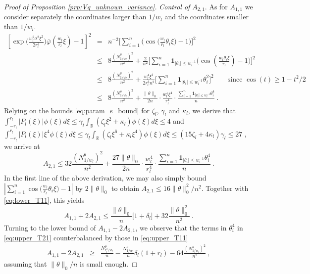 \documentclass[twoside,11pt]{article}
\def\beq{\begin{equation}}
\def\eeq{\end{equation}}
\def\beqn{\begin{eqnarray*}}
\def\eeqn{\end{eqnarray*}}
\def\bbR{\mathbb{R}}
\newcommand{\<}{\langle}
\renewcommand{\>}{\rangle}
\begin{document}
\begin{proof}[Proof of Proposition \ref{prp:Vq_unknown_variance}]
\noindent 
{\it Control of $A_{2,1}$}. As for $A_{1,1}$ we consider separately the coordinates larger than $1/w_l$ and the coordinates smaller than $1/w_l$.
\beqn 
\left[\exp\big(\frac{w_l^2\sigma^2\xi^2}{2r_l^2}\big)\overline{\varphi}(\frac{w_l}{r_l}\xi)- 1\right]^2&=& n^{-2}\big[\sum_{i=1}^n \big(\cos\big(\frac{w_l}{r_l}\theta_i\xi\big) -1\big) \big]^2\\ &\leq& 8 \frac{(N_{1/w_l}^{\theta})^2}{n^2}+\frac{2}{n^2}\big[\sum_{i=1}^n \mathbf{1}_{|\theta_i|\leq w_l^{-1}}\big(\cos(\frac{w_l\theta_i\xi}{r_l})-1\big) \big]^2\\
&\leq & 8 \frac{(N_{1/w_l}^{\theta})^2}{n^2}+\frac{w_l^4\xi^4}{2r_l^4n^2}\big[\sum_{i=1}^n \mathbf{1}_{|\theta_i|\leq w_l^{-1}} \theta_i^2  \big]^2\quad\quad \text{since }\cos(t)\geq 1-t^2/2\\
&\leq & 8 \frac{(N_{1/w_l}^{\theta})^2}{n^2}+\frac{\|\theta\|_0}{2n}\cdot \frac{w_l^4\xi^4}{r_l^4}\cdot\frac{\sum_{i=1}^n \mathbf{1}_{|\theta_i|\leq w_l^{-1}}  \theta_i^4}{n}\ .
\eeqn 
Relying on the bounds \eqref{eq:param_s_bound} for $\zeta_l$, $\gamma_l$ and $\kappa_l$, we derive that
$\int_{-r_l}^{r_l} |P_l(\xi)|\phi(\xi) d\xi\leq \gamma_l\int_{\bbR}(\zeta_l \xi^2 + \kappa_l)\phi(\xi)d\xi\leq 4$ and $\int_{-r_l}^{r_l} |P_l(\xi)|\xi^4\phi(\xi)d\xi\leq \gamma_l \int_{\bbR}(\zeta_l \xi^6 + \kappa_l\xi^4)\phi(\xi)d\xi\leq (15\zeta_l + 4 \kappa_l)\gamma_l \leq 27$ , we arrive at
\beq\label{eq:upper_T21}
A_{2,1}\leq 32\frac{(N_{1/w_l}^{\theta})^2}{n^2} + \frac{27\|\theta\|_0}{2n}\cdot \frac{w_l^4}{r_l^4}\cdot\frac{\sum_{i=1}^n \mathbf{1}_{|\theta_i|\leq w_l^{-1}}  \theta_i^4}{n}\ .
\eeq
In the first line of the above derivation, we may also simply bound $|\sum_{i=1}^n \cos\big(\frac{w_l}{r_l}\theta_i\xi\big) -1 |$ by $2\|\theta\|_0$ to obtain $A_{2,1}\leq 16\|\theta\|_0^2/n^2$.
Together with  \eqref{eq:lower_T11}, this yields
\beq \label{eq:upper_A_deterministic}
A_{1,1}+ 2A_{2,1}\leq \frac{\|\theta\|_0}{n}\big[1+ \delta_l\big] + 32\frac{\|\theta\|_0^2}{n^2}\ . 
\eeq
Turning to the lower bound of $A_{1,1}-2A_{2,1}$, we observe that the terms in $\theta_i^4$ in  \eqref{eq:upper_T21} counterbalanced by those in  \eqref{eq:upper_T11}
\begin{eqnarray}
 A_{1,1}- 2A_{2,1}&\geq& \frac{N_{r_l^2/w_l}^{\theta}}{n}   - \frac{N_{1/w_l}^{\theta}}{n}  \delta_l(1+r_l)  - 64 \frac{(N_{1/w_l}^{\theta})^2}{n^2}\ , \label{eq:lower_A_deterministic}
\end{eqnarray}
assuming that $\|\theta\|_0/n$ is small enough.


\bigskip 




\end{proof}
\end{document}
